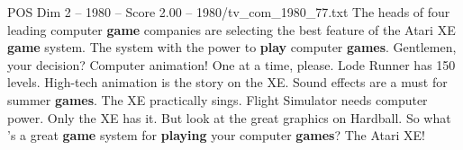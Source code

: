 \begin{textsample}{POS Dim 2 – 1980 – Score 2.00 – 1980/tv\_com\_1980\_77.txt}  \label{ex:f2_pos_065}
The heads of four leading computer \textbf{game} companies are selecting the best feature of the Atari XE \textbf{game} system.
The system with the power to \textbf{play} computer \textbf{games}.
Gentlemen, your decision?
Computer animation!
One at a time, please.
Lode Runner has 150 levels.
High-tech animation is the story on the XE.
Sound effects are a must for summer \textbf{games}.
The XE practically sings.
Flight Simulator needs computer power.
Only the XE has it.
But look at the great graphics on Hardball.
So what 's a great \textbf{game} system for \textbf{playing} your computer \textbf{games}?
The Atari XE!

\end{textsample}
